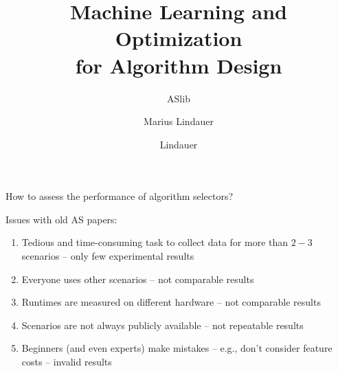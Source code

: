 \documentclass[t]{beamer}
\title[MLOAD]{Machine Learning and Optimization\\ for Algorithm Design}
\subtitle{ASlib}
\author{Marius Lindauer}
\institute{University of Freiburg}
\date{}
\begin{document}
{
}
\author{Lindauer}
\institute{}
\logo{}

\begin{frame}[c]{How to assess the performance of algorithm selectors?}

Issues with old AS papers:

\begin{enumerate}
  \item Tedious and time-consuming task to collect data for more than $2-3$ scenarios -- only few experimental results
	\pause
  \medskip
  \item Everyone uses other scenarios -- not comparable results
  \item Runtimes are measured on different hardware -- not comparable results
  \pause
  \medskip
  \item Scenarios are not always publicly available -- not repeatable results
  \pause
  \medskip
  \item Beginners (and even experts) make mistakes -- e.g., don't consider feature costs -- invalid results
\end{enumerate}
\end{frame}
\end{document}
